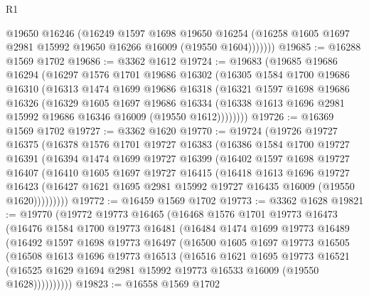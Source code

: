 \begin{lexlean}{R1}
\begin{coremodule}
            @19650
            @16246
            (@16249
              @1597
              @1698
              @19650
              @16254
              (@16258 @1605 @1697 @2981 @15992 @19650 @16266 @16009 (@19550 @1604)))))))
@19685 := @16288 @1569 @1702
@19686 := @3362 @1612
@19724 := @19683
    (@19685
      @19686
      @16294
      (@16297
        @1576
        @1701
        @19686
        @16302
        (@16305
          @1584
          @1700
          @19686
          @16310
          (@16313
            @1474
            @1699
            @19686
            @16318
            (@16321
              @1597
              @1698
              @19686
              @16326
              (@16329
                @1605
                @1697
                @19686
                @16334
                (@16338 @1613 @1696 @2981 @15992 @19686 @16346 @16009 (@19550 @1612))))))))
@19726 := @16369 @1569 @1702
@19727 := @3362 @1620
@19770 := @19724
    (@19726
      @19727
      @16375
      (@16378
        @1576
        @1701
        @19727
        @16383
        (@16386
          @1584
          @1700
          @19727
          @16391
          (@16394
            @1474
            @1699
            @19727
            @16399
            (@16402
              @1597
              @1698
              @19727
              @16407
              (@16410
                @1605
                @1697
                @19727
                @16415
                (@16418
                  @1613
                  @1696
                  @19727
                  @16423
                  (@16427 @1621 @1695 @2981 @15992 @19727 @16435 @16009 (@19550 @1620)))))))))
@19772 := @16459 @1569 @1702
@19773 := @3362 @1628
@19821 := @19770
    (@19772
      @19773
      @16465
      (@16468
        @1576
        @1701
        @19773
        @16473
        (@16476
          @1584
          @1700
          @19773
          @16481
          (@16484
            @1474
            @1699
            @19773
            @16489
            (@16492
              @1597
              @1698
              @19773
              @16497
              (@16500
                @1605
                @1697
                @19773
                @16505
                (@16508
                  @1613
                  @1696
                  @19773
                  @16513
                  (@16516
                    @1621
                    @1695
                    @19773
                    @16521
                    (@16525 @1629 @1694 @2981 @15992 @19773 @16533 @16009 (@19550 @1628))))))))))
@19823 := @16558 @1569 @1702

\end{coremodule}
\end{lexlean}
